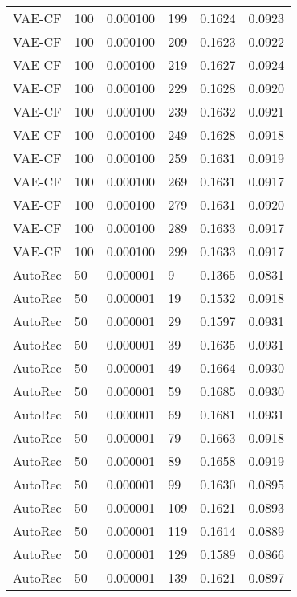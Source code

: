 \begin{tabular}{llrlrr}
  VAE-CF &  100 &  0.000100 &   199 &  0.1624 &       0.0923 \\
  VAE-CF &  100 &  0.000100 &   209 &  0.1623 &       0.0922 \\
  VAE-CF &  100 &  0.000100 &   219 &  0.1627 &       0.0924 \\
  VAE-CF &  100 &  0.000100 &   229 &  0.1628 &       0.0920 \\
  VAE-CF &  100 &  0.000100 &   239 &  0.1632 &       0.0921 \\
  VAE-CF &  100 &  0.000100 &   249 &  0.1628 &       0.0918 \\
  VAE-CF &  100 &  0.000100 &   259 &  0.1631 &       0.0919 \\
  VAE-CF &  100 &  0.000100 &   269 &  0.1631 &       0.0917 \\
  VAE-CF &  100 &  0.000100 &   279 &  0.1631 &       0.0920 \\
  VAE-CF &  100 &  0.000100 &   289 &  0.1633 &       0.0917 \\
  VAE-CF &  100 &  0.000100 &   299 &  0.1633 &       0.0917 \\
 AutoRec &   50 &  0.000001 &     9 &  0.1365 &       0.0831 \\
 AutoRec &   50 &  0.000001 &    19 &  0.1532 &       0.0918 \\
 AutoRec &   50 &  0.000001 &    29 &  0.1597 &       0.0931 \\
 AutoRec &   50 &  0.000001 &    39 &  0.1635 &       0.0931 \\
 AutoRec &   50 &  0.000001 &    49 &  0.1664 &       0.0930 \\
 AutoRec &   50 &  0.000001 &    59 &  0.1685 &       0.0930 \\
 AutoRec &   50 &  0.000001 &    69 &  0.1681 &       0.0931 \\
 AutoRec &   50 &  0.000001 &    79 &  0.1663 &       0.0918 \\
 AutoRec &   50 &  0.000001 &    89 &  0.1658 &       0.0919 \\
 AutoRec &   50 &  0.000001 &    99 &  0.1630 &       0.0895 \\
 AutoRec &   50 &  0.000001 &   109 &  0.1621 &       0.0893 \\
 AutoRec &   50 &  0.000001 &   119 &  0.1614 &       0.0889 \\
 AutoRec &   50 &  0.000001 &   129 &  0.1589 &       0.0866 \\
 AutoRec &   50 &  0.000001 &   139 &  0.1621 &       0.0897 \\

\end{tabular}
